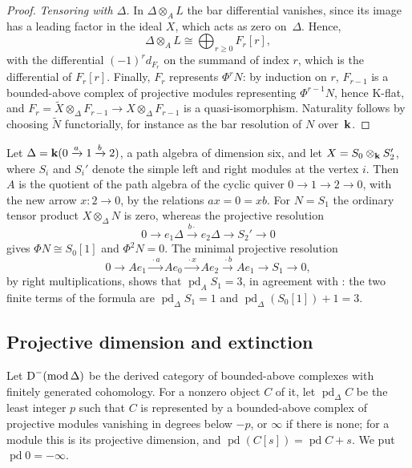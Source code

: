 \begin{proof}
  \emph{Tensoring with $\Delta$.} In ${\Delta\otimes_AL}$ the bar differential
  vanishes, since its image has a leading factor in the ideal $X$, which acts
  as zero on~$\Delta$. Hence,
  \[
    \Delta\otimes_AL\cong\bigoplus_{r\geq0}F_r[r],
  \]
  with the differential ${(-1)^rd_{F_r}}$ on the summand of index $r$, which is
  the differential of $F_r[r]$. Finally, $F_r$ represents $\Phi^rN$: by
  induction on $r$, $F_{r-1}$ is a bounded-above complex of projective modules
  representing $\Phi^{r-1}N$, hence K-flat, and
  ${F_r=\widetilde{X}\otimes_\Delta F_{r-1}\to X\otimes_\Delta F_{r-1}}$ is a
  quasi-isomorphism. Naturality follows by choosing $\widetilde{N}$
  functorially, for instance as the bar resolution of $N$ over~$\mathbf{k}$.
\end{proof}

\begin{example}
  \label{ex:derived-powers}
  Let ${\Delta=\mathbf{k}(0\xrightarrow{a}1\xrightarrow{b}2)}$, a path algebra of
  dimension six, and let ${X=S_0\otimes_{\mathbf{k}} S_2'}$, where $S_i$ and $S_i'$ denote
  the simple left and right modules at the vertex $i$. Then $A$ is the quotient
  of the path algebra of the cyclic quiver ${0\to1\to2\to0}$, with the new arrow
  ${x\colon2\to0}$, by the relations ${ax=0=xb}$. For ${N=S_1}$ the ordinary tensor
  product ${X\otimes_\Delta N}$ is zero, whereas the projective resolution
  \[
    0\longrightarrow e_1\Delta\xrightarrow{\,b\cdot\,}e_2\Delta\longrightarrow
    S_2'\longrightarrow0
  \]
  gives ${\Phi N\cong S_0[1]}$ and ${\Phi^2N=0}$. The minimal projective resolution
  \[
    0\longrightarrow Ae_1\xrightarrow{\,\cdot a\,}Ae_0\xrightarrow{\,\cdot x\,}
    Ae_2\xrightarrow{\,\cdot b\,}Ae_1\longrightarrow S_1\longrightarrow0,
  \]
  by right multiplications, shows that ${\operatorname{pd}_AS_1=3}$, in agreement
  with : the two finite terms of the formula are
  ${\operatorname{pd}_\Delta S_1=1}$ and ${\operatorname{pd}_\Delta(S_0[1])+1=3}$.
\end{example}

\subsection{Projective dimension and extinction}
\label{subsec:pd-formula}

Let ${\DerCat[-]{\operatorname{mod}\Delta}}$ be the derived category of
bounded-above complexes with finitely generated cohomology. For a nonzero
object $C$ of it, let $\operatorname{pd}_\Delta C$ be the least integer $p$ such
that $C$ is represented by a bounded-above complex of projective modules
vanishing in degrees below ${-p}$, or $\infty$ if there is none; for a module
this is its projective dimension, and
${\operatorname{pd}(C[s])=\operatorname{pd}C+s}$. We put
${\operatorname{pd}0=-\infty}$.

